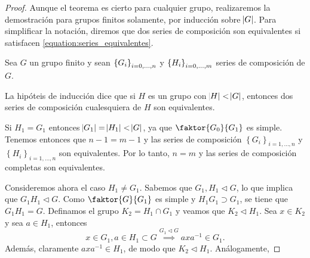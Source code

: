 \begin{proof}
    Aunque el teorema es cierto para cualquier grupo, realizaremos la demostración para grupos
    finitos solamente, por inducción sobre $\abs{G}$. Para simplificar la notación, diremos que dos series de composición
    son equivalentes si satisfacen \ref{equation:series_equivalentes}.

    Sea $G$ un grupo finito y sean $\left\{G_i\right\}_{i=0,\dots,n}$ y $\left\{H_i\right\}_{i=0, \dots, m}$ series de composición de $G$.

    La hipóteis de inducción dice que si $H$ es un grupo con $\abs{H} < \abs{G}$, entonces dos series de 
    composición cualesquiera de $H$ son equivalentes.

    Si $H_1 = G_1$ entonces $\abs{G_1} = \abs{H_1} < \abs{G}$, ya que $\faktor{G_0}{G_1}$ es simple.
    Tenemos entonces que $n-1 = m-1$ y las series de composición $\left\{ G_i \right\}_{i=1,\dots,n}$
    y $\left\{ H_i \right\}_{i=1,\dots,n}$ son equivalentes. Por lo tanto, $n = m$ y las series de composición completas
    son equivalentes.

    Consideremos ahora el caso $H_1 \neq G_1$. Sabemos que $G_1, H_1 \triangleleft G$, lo que implica que $G_1 H_1 \triangleleft G$.
    Como $\faktor{G}{G_1}$ es simple y $H_1 G_1 \supset G_1$, se tiene que $G_1H_1  = G$. Definamos el grupo
    $K_2 = H_1 \cap G_1$ y veamos que $K_2 \triangleleft H_1$. Sea $x \in K_2$ y sea $a \in H_1$, entonces
    \[
        x \in G_1, a \in H_1 \subset G \stackrel{G_1 \triangleleft G}{\implies} axa^{-1} \in G_1.
    \]
    Además, claramente $axa^{-1} \in H_1$, de modo que $K_2 \triangleleft H_1$. Análogamente,


\end{proof}
